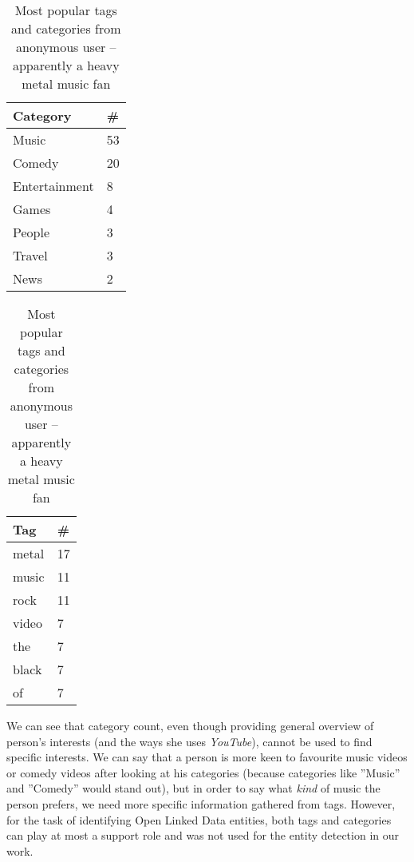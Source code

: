 \begin{table}[ht]
\begin{minipage}[b]{0.5\linewidth}\centering

\begin{tabular}{| l | l |}
Category & \# \\ \hline
Music & 53 \\
Comedy & 20 \\
Entertainment & 8 \\
Games & 4 \\
People & 3 \\
Travel & 3 \\
News & 2 \\
\end{tabular}

\end{minipage}
\hspace{0.5cm}
\begin{minipage}[b]{0.5\linewidth}
\centering

\begin{tabular}{| l | l |}
Tag & \# \\ \hline
metal & 17 \\
music & 11 \\
rock & 11 \\
video & 7 \\
the & 7 \\
black & 7 \\
of & 7 \\
\end{tabular}

\end{minipage}

\caption{Most popular tags and categories from anonymous user -- apparently a
heavy metal music fan}
\end{table}

We can see that category count, even though providing general overview of
person's interests (and the ways she uses \textit{YouTube}), cannot be used to find
specific interests. We can say that a person is more keen to
favourite music videos or comedy videos after looking at his categories
(because categories like ''Music'' and ''Comedy'' would stand out), but in
order to say what \textit{kind} of music the person prefers, we need more specific
information gathered from \eg tags. However, for the task of identifying Open Linked
Data entities, both tags and categories can play at most a support role and was
not used for the entity detection in our work.

